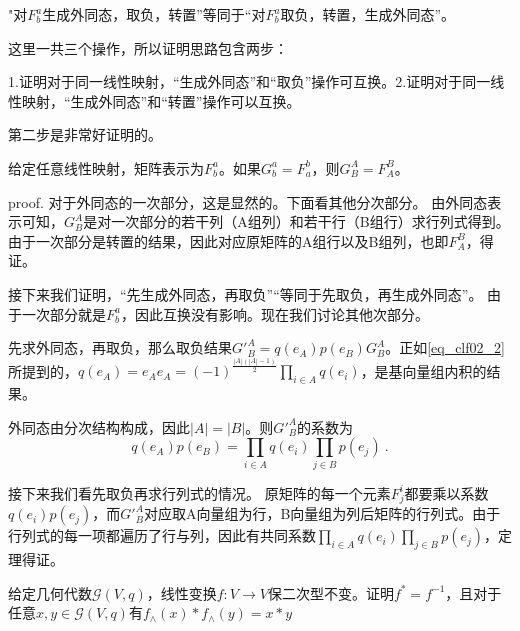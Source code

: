 "对$F^a_b$生成外同态，取负，转置”等同于“对$F^a_b$取负，转置，生成外同态”。

这里一共三个操作，所以证明思路包含两步：

1.证明对于同一线性映射，“生成外同态”和“取负”操作可互换。2.证明对于同一线性映射，“生成外同态”和“转置”操作可以互换。

第二步是非常好证明的。
\begin{lemma}{}
给定任意线性映射，矩阵表示为$F^a_b$。如果$G^a_b=F^b_a$，则$G^A_B=F^B_A$。
\end{lemma}
proof.
对于外同态的一次部分，这是显然的。下面看其他分次部分。
由外同态表示可知，$G^A_B$是对一次部分的若干列（A组列）和若干行（B组行）求行列式得到。由于一次部分是转置的结果，因此对应原矩阵的A组行以及B组列，也即$F^B_A$，得证。

接下来我们证明，“先生成外同态，再取负”“等同于先取负，再生成外同态”。
由于一次部分就是$F^a_b$，因此互换没有影响。现在我们讨论其他次部分。

先求外同态，再取负，那么取负结果$G'^A_B=q(e_A)p(e_B)G^A_B$。正如\autoref{eq_clf02_2} 所提到的，$q(e_A)=e_Ae_A=
(-1)^{\frac{|A|(|A|-1)}{2}} \prod_{i \in A} q(e_i)$，是基向量组内积的结果。

外同态由分次结构构成，因此$|A|=|B|$。则$G'^A_B$的系数为
\begin{equation}
q(e_A)p(e_B)=\prod_{i \in A} q(e_i)\prod_{j \in B} p(e_j)~.
\end{equation}

接下来我们看先取负再求行列式的情况。
原矩阵的每一个元素$F^i_j$都要乘以系数$q(e_i)p(e_j)$，而$G'^A_B$对应取A向量组为行，B向量组为列后矩阵的行列式。由于行列式的每一项都遍历了行与列，因此有共同系数$\prod_{i \in A} q(e_i)\prod_{j \in B} p(e_j)$，定理得证。


\begin{exercise}{}
给定几何代数$\mathcal G(V,q)$，线性变换$f:V\rightarrow V$保二次型不变。证明$f^*=f^{-1}$，且对于任意$x,y\in\mathcal G(V,q)$有$f_{\wedge}(x)*f_{\wedge}(y)=x*y$
\end{exercise}
